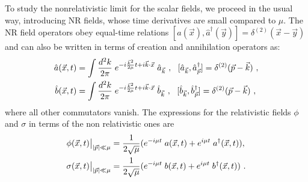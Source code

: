 \documentclass[11pt]{article}
\begin{document}
To study the nonrelativistic limit for the scalar fields, we proceed in the usual way, introducing NR fields, whose time derivatives are small compared to  $\mu$. The NR field operators obey equal-time relations $[ \hat{a}(\vec{x}), \hat{a}^\dagger (\vec{y}) ] = \delta^{(2)}(\vec{x}-\vec{y})$ and can also be written in terms of creation and annihilation operators as:
 \begin{align}\label{eq:scalarNRfields1}
\hat a(\vec{x},t)   &= \int {d^2 k \over 2 \pi} \; e^{- i {\vec{k}^2 \over 2 \mu} t + i \vec{k}\cdot \vec{x} } \; \hat a_{\vec{k}}~,~~  
 [ \hat a_{\vec{k}}, \hat a_{\vec{p}}^\dagger  ] = \delta^{(2)} (\vec{p}- \vec{k}) ~, 
 \nonumber \\
\hat b (\vec{x},t) &= \int {d^2 k \over 2 \pi} \; e^{- i {\vec{k}^2 \over 2 \mu} t + i \vec{k}\cdot \vec{x} } \; \hat b_{\vec{k}}~,~~[ \hat b_{\vec{k}}, \hat b_{\vec{p}}^\dagger  ] = \delta^{(2)} (\vec{p}- \vec{k})~,
\end{align}
where all other commutators vanish.
The  expressions for the relativistic fields $\phi$ and $\sigma$ in terms of the non relativistic ones are\begin{align}\label{eq:scalarNRfields}
 \phi(\vec{x},t)\big\vert_{|\vec{p}| \ll \mu}  &= {1 \over 2 \sqrt{   \mu }} (e^{- i \mu t} \; { a}(\vec{x},t) + e^{  i \mu  t} \;   a^\dagger(\vec{x},t)),\nonumber\\
 \sigma(\vec{x},t)\big\vert_{|\vec{p}| \ll \mu} &= {1 \over 2  \sqrt{   \mu}} (e^{- i \mu t}\;   b(\vec{x},t) + e^{  i \mu  t} \;  b^\dagger(\vec{x},t))~.
\end{align}
 
\end{document}
